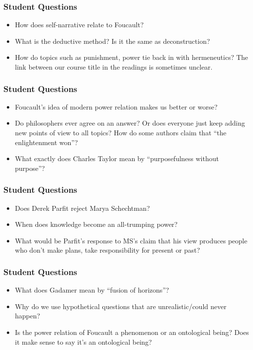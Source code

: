 \documentclass[xcolor=dvipsnames]{beamer}
\begin{document}
\begin{frame}
  \frametitle{Student Questions}
  \begin{itemize}
  \item How does self-narrative relate to Foucault?
  \item What is the deductive method? Is it the same as
    deconstruction?
  \item How do topics such as punishment, power tie back in with
    hermeneutics? The link between our course title in the readings is
    sometimes unclear.
  \end{itemize}
\end{frame}

\begin{frame}
  \frametitle{Student Questions}
  \begin{itemize}
  \item Foucault's idea of modern power relation makes us better or
    worse?
  \item Do philosophers ever agree on an answer? Or does everyone just
    keep adding new points of view to all topics? How do some authors
    claim that ``the enlightenment won''?
  \item What exactly does Charles Taylor mean by ``purposefulness
    without purpose''?
  \end{itemize}
\end{frame}

\begin{frame}
  \frametitle{Student Questions}
  \begin{itemize}
  \item Does Derek Parfit reject Marya Schechtman?
  \item When does knowledge become an all-trumping power?
  \item What would be Parfit's response to MS's claim that his view
    produces people who don't make plans, take responsibility for
    present or past?
  \end{itemize}
\end{frame}

\begin{frame}
  \frametitle{Student Questions}
  \begin{itemize}
  \item What does Gadamer mean by ``fusion of horizons''?
  \item Why do we use hypothetical questions that are
    unrealistic/could never happen?
  \item Is the power relation of Foucault a phenomenon or an
    ontological being? Does it make sense to say it's an ontological
    being?
  \end{itemize}
\end{frame}
\end{document}
